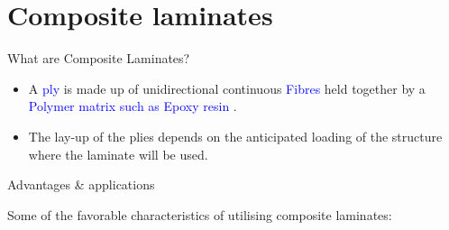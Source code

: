 \documentclass[10pt,aspectratio=169]{beamer} %
\begin{document}
\section{Composite laminates}
\begin{frame}{What are Composite Laminates?}
	\begin{minipage}[c]{.3\textwidth}
		\small
		\begin{itemize}
			\item A \textcolor{blue}{ply} is made up of unidirectional continuous \textcolor{blue}{Fibres} held together by a \textcolor{blue}{Polymer matrix such as Epoxy resin} .			
			\item The lay-up of the plies depends on the anticipated loading of the structure where the laminate will be used.
		\end{itemize}
	\end{minipage}
	\hfill
	\begin{minipage}[c]{.65\textwidth}
		\begin{figure}
		\end{figure}				
	\end{minipage}
\end{frame}
\begin{frame}{Advantages \& applications}
	\begin{minipage}[c]{.45\textwidth}
		Some of the favorable characteristics of utilising composite laminates:
		\begin{itemize}
		\end{itemize}
	\end{minipage}
	\hfill
\end{frame}
\end{document}
